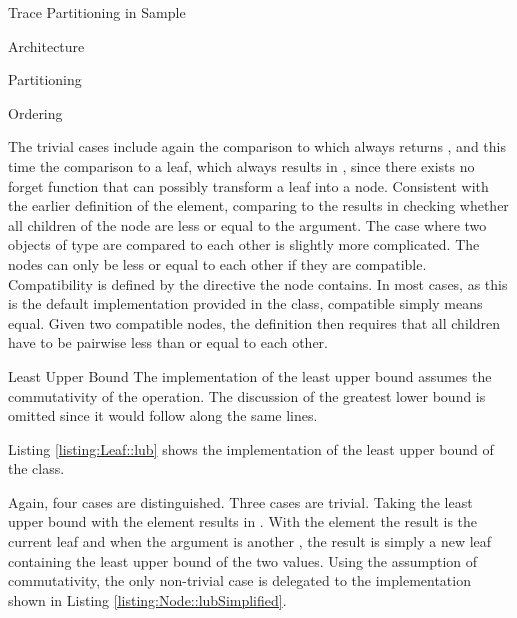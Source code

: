 \begin{chapter}{Trace Partitioning in Sample}
\begin{section}{Architecture}
\begin{subsection}{Partitioning}
\begin{subsubsection}{Ordering}
				

				The trivial cases include again the comparison to  which always returns , and this time the comparison to a leaf, which always results in , since there exists no forget function that can possibly transform a leaf into a node. Consistent with the earlier definition of the  element, comparing to the  results in checking whether all children of the node are less or equal to the argument. The case where two objects of type  are compared to each other is slightly more complicated. The nodes can only be less or equal to each other if they are compatible. Compatibility is defined by the directive the node contains. In most cases, as this is the default implementation provided in the  class, compatible simply means equal. Given two compatible nodes, the definition then requires that all children have to be pairwise less than or equal to each other.
			\end{subsubsection}


			\begin{subsubsection}{Least Upper Bound}
				The implementation of the least upper bound assumes the commutativity of the operation. The discussion of the greatest lower bound is omitted since it would follow along the same lines.

				Listing \ref{listing:Leaf::lub} shows the implementation of the least upper bound of the  class.
				
				

				Again, four cases are distinguished. Three cases are trivial. Taking the least upper bound with the  element results in . With the  element the result is the current leaf and when the argument is another , the result is simply a new leaf containing the least upper bound of the two values. Using the assumption of commutativity, the only non-trivial case is delegated to the  implementation shown in Listing \ref{listing:Node::lubSimplified}.

				


\end{subsubsection}
\end{subsection}
\end{section}
\end{chapter}
